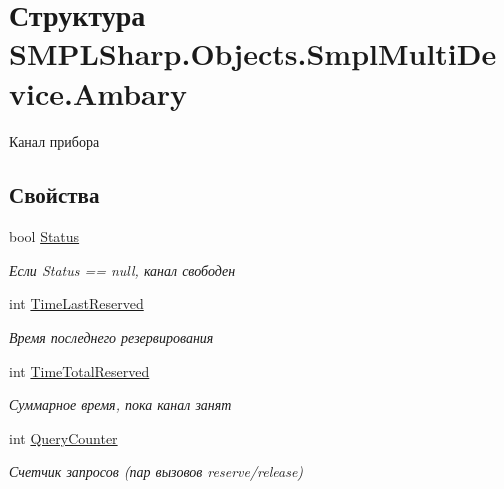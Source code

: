 \hypertarget{struct_s_m_p_l_sharp_1_1_objects_1_1_smpl_multi_device_1_1_ambary}{\section{Структура S\-M\-P\-L\-Sharp.\-Objects.\-Smpl\-Multi\-Device.\-Ambary}
\label{d1/df4/struct_s_m_p_l_sharp_1_1_objects_1_1_smpl_multi_device_1_1_ambary}
}


Канал прибора  


\subsection*{Свойства}
\begin{DoxyCompactItemize}
\item 
bool \hyperlink{struct_s_m_p_l_sharp_1_1_objects_1_1_smpl_multi_device_1_1_ambary_ae9cea4ed6bb76111ae7d714c27e2499f}{Status}
\begin{DoxyCompactList}\small\item\em Если Status == null, канал свободен \end{DoxyCompactList}\item 
int \hyperlink{struct_s_m_p_l_sharp_1_1_objects_1_1_smpl_multi_device_1_1_ambary_af51ba6a3079bd09a71f4cc797beb9e6a}{Time\-Last\-Reserved}
\begin{DoxyCompactList}\small\item\em Время последнего резервирования \end{DoxyCompactList}\item 
int \hyperlink{struct_s_m_p_l_sharp_1_1_objects_1_1_smpl_multi_device_1_1_ambary_a8f8b20fb74105cecd5af51513d5b7826}{Time\-Total\-Reserved}
\begin{DoxyCompactList}\small\item\em Суммарное время, пока канал занят \end{DoxyCompactList}\item 
int \hyperlink{struct_s_m_p_l_sharp_1_1_objects_1_1_smpl_multi_device_1_1_ambary_a12e73f17080970b2bbc38c3ac17ae550}{Query\-Counter}
\begin{DoxyCompactList}\small\item\em Счетчик запросов (пар вызовов reserve/release) \end{DoxyCompactList}\end{DoxyCompactItemize}


